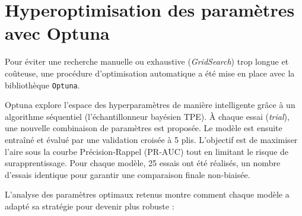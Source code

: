 \documentclass{article}
\begin{document}
\section{Hyperoptimisation des paramètres avec Optuna}
Pour éviter une recherche manuelle ou exhaustive (\textit{GridSearch}) trop longue et coûteuse, une procédure d'optimisation automatique a été mise en place avec la bibliothèque \texttt{Optuna}. 

Optuna explore l'espace des hyperparamètres de manière intelligente grâce à un algorithme séquentiel (l'échantillonneur bayésien TPE). À chaque essai (\textit{trial}), une nouvelle combinaison de paramètres est proposée. Le modèle est ensuite entraîné et évalué par une validation croisée à 5 plis. L'objectif est de maximiser l'aire sous la courbe Précision-Rappel ($\text{PR-AUC}$) tout en limitant le risque de surapprentissage. Pour chaque modèle, 25 essais ont été réalisés, un nombre d'essais identique pour garantir une comparaison finale non-biaisée.

L'analyse des paramètres optimaux retenus montre comment chaque modèle a adapté sa stratégie pour devenir plus robuste :
\end{document}
